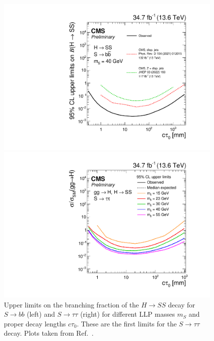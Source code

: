 \documentclass{moriond}
\begin{document}
\begin{figure}
\begin{minipage}{0.5\linewidth}
\centerline{\includegraphics[width=1.0\linewidth]{CMS-PAS-EXO-23-013_Figure_004-a.pdf}}
\end{minipage}
\hfill
\begin{minipage}{0.5\linewidth}
\centerline{\includegraphics[width=1.0\linewidth]{CMS-PAS-EXO-23-013_Figure_003-c.pdf}}
\end{minipage}
\caption[]{Upper limits on the branching fraction of the $H \rightarrow
  SS$ decay for $S\rightarrow bb$ (left) and $S\rightarrow \tau\tau$
  (right) for different LLP masses $m_S$ and proper decay lengths
  $c\tau_{0}$. These are the first limits for the $S \rightarrow
  \tau\tau$ decay. Plots taken from Ref.~\cite{CMS-PAS-EXO-23-013}.}
\label{fig:run3}
\end{figure}
\end{document}
